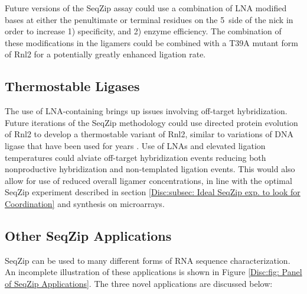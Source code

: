     Future versions of the SeqZip assay could use a combination of LNA modified bases \citep{You2006} at either the penultimate or terminal residues on the 5\textprime~side of the nick in order to increase 1) specificity, and 2) enzyme efficiency. The combination of these modifications in the ligamers could be combined with a T39A mutant form of Rnl2 for a potentially greatly enhanced ligation rate.

  \subsection{Thermostable Ligases}
    \label{Disc:subsec:Thermostable Ligases}

    The use of LNA-containing brings up issues involving off-target hybridization. Future iterations of the SeqZip methodology could use directed protein evolution of Rnl2 \citep{Stemmer1994, Romero2009a} to develop a thermostable variant of Rnl2, similar to variations of DNA ligase that have been used for years \citep{Barany1991}. Use of LNAs and elevated ligation temperatures could alviate off-target hybridization events reducing both nonproductive hybridization and non-templated ligation events. This would also allow for use of reduced overall ligamer concentrations, in line with the optimal SeqZip experiment described in section \ref{Disc:subsec: Ideal SeqZip exp. to look for Coordination} and synthesis on microarrays.

  \subsection{Other SeqZip Applications}
    \label{Disc:subsec:Future Uses of SeqZip}

    SeqZip can be used to many different forms of RNA sequence characterization. An incomplete illustration of these applications is shown in Figure \ref{Disc:fig: Panel of SeqZip Applications}. The three novel applications are discussed below:

